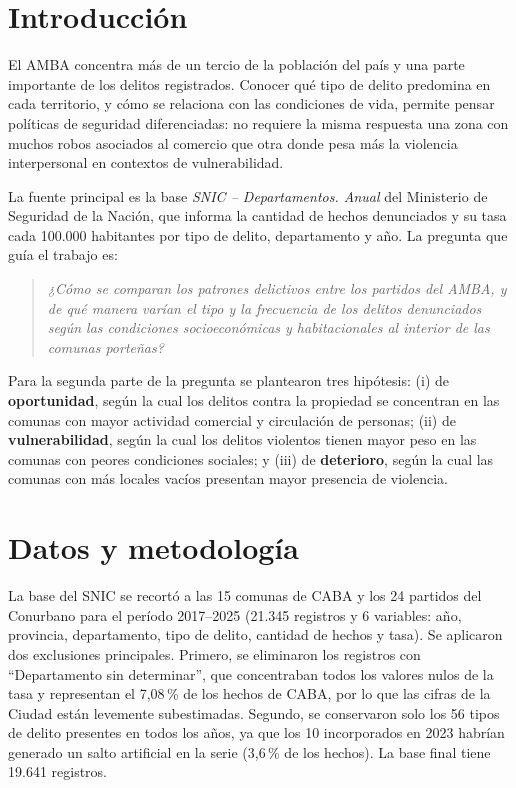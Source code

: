 \documentclass[11pt,a4paper]{article}
\begin{document}
\section{Introducción}
El AMBA concentra más de un tercio de la población del país y una parte importante de los delitos registrados. Conocer qué tipo de delito predomina en cada territorio, y cómo se relaciona con las condiciones de vida, permite pensar políticas de seguridad diferenciadas: no requiere la misma respuesta una zona con muchos robos asociados al comercio que otra donde pesa más la violencia interpersonal en contextos de vulnerabilidad.

La fuente principal es la base \textit{SNIC -- Departamentos. Anual} del Ministerio de Seguridad de la Nación, que informa la cantidad de hechos denunciados y su tasa cada 100.000 habitantes por tipo de delito, departamento y año. La pregunta que guía el trabajo es:

\begin{quote}
\textit{¿Cómo se comparan los patrones delictivos entre los partidos del AMBA, y de qué manera varían el tipo y la frecuencia de los delitos denunciados según las condiciones socioeconómicas y habitacionales al interior de las comunas porteñas?}
\end{quote}

Para la segunda parte de la pregunta se plantearon tres hipótesis: (i) de \textbf{oportunidad}, según la cual los delitos contra la propiedad se concentran en las comunas con mayor actividad comercial y circulación de personas; (ii) de \textbf{vulnerabilidad}, según la cual los delitos violentos tienen mayor peso en las comunas con peores condiciones sociales; y (iii) de \textbf{deterioro}, según la cual las comunas con más locales vacíos presentan mayor presencia de violencia.

\section{Datos y metodología}
La base del SNIC se recortó a las 15 comunas de CABA y los 24 partidos del Conurbano para el período 2017--2025 (21.345 registros y 6 variables: año, provincia, departamento, tipo de delito, cantidad de hechos y tasa). Se aplicaron dos exclusiones principales. Primero, se eliminaron los registros con ``Departamento sin determinar'', que concentraban todos los valores nulos de la tasa y representan el 7,08\,\% de los hechos de CABA, por lo que las cifras de la Ciudad están levemente subestimadas. Segundo, se conservaron solo los 56 tipos de delito presentes en todos los años, ya que los 10 incorporados en 2023 habrían generado un salto artificial en la serie (3,6\,\% de los hechos). La base final tiene 19.641 registros.
\end{document}
